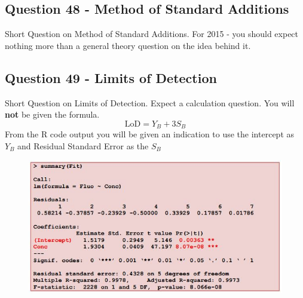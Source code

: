 \documentclass[a4paper,12pt]{article}
\begin{document}
\newpage
\subsection*{Question 48 - Method of Standard Additions}
Short Question on Method of Standard Additions. For 2015 - you should expect nothing more than a general theory question on the idea behind it.
\subsection*{Question 49 - Limits of Detection}
Short Question on Limits of Detection. Expect a calculation question. You will \textbf{not} be given the formula.
\[\mbox{LoD} = Y_B + 3S_B\]
From the R code output you will be given an indication to use the intercept  as $Y_B$ and  Residual Standard Error  as the $S_B$ %
\begin{figure}[h!]
\centering
\includegraphics[width=1.1\linewidth]{image/LoD}
\caption{}
\label{fig:LoD}
\end{figure}
\end{document}
